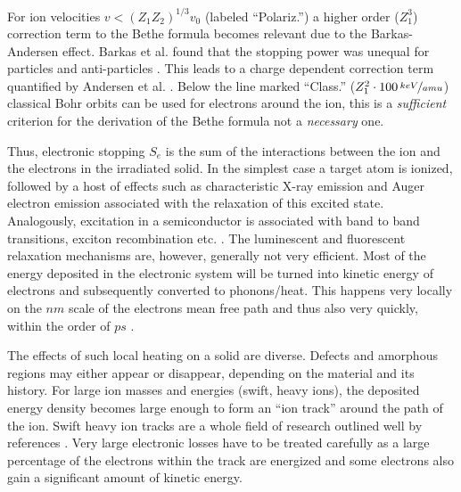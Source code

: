 For ion velocities $v < (Z_1Z_2)^{1/3}v_0$ (labeled ``Polariz.'') a higher order ($Z_1^3$) correction term to the Bethe formula becomes relevant due to the Barkas-Andersen effect. Barkas et al. found that the stopping power was unequal for particles and anti-particles \cite{smith_measurements_1953}. This leads to a charge dependent correction term quantified by Andersen et al. \cite{andersen_experimental_1969,sigmund_notes_2014}. Below the line marked ``Class.'' ($Z_1^2\cdot 100\,\nicefrac{keV}{amu}$) classical Bohr orbits can be used for electrons around the ion, this is a \emph{sufficient} criterion for the derivation of the Bethe formula not a \emph{necessary} one.

Thus, electronic stopping $S_e$ is the sum of the interactions between the ion and the electrons in the irradiated solid. In the simplest case a target atom is ionized, followed by a host of effects such as characteristic X-ray emission and Auger electron emission associated with the relaxation of this excited state. Analogously, excitation in a semiconductor is associated with band to band transitions, exciton recombination etc. \cite{wiedemann_uber_1888,boden_ionoluminescence_201}. The luminescent and fluorescent relaxation mechanisms are, however, generally not very efficient. Most of the energy deposited in the electronic system will be turned into kinetic energy of electrons and subsequently converted to phonons/heat. This happens very locally on the $nm$ scale of the electrons mean free path and thus also very quickly, within the order of $ps$ \cite{toulemonde_transient_1992, nastasi/mayer/hirvonen_ion-solid_2008}. 


The effects of such local heating on a solid are diverse. Defects and amorphous regions may either appear or disappear, depending on the material and its history. For large ion masses and energies (swift, heavy ions), the deposited energy density becomes large enough to form an ``ion track'' around the path of the ion. Swift heavy ion tracks are a whole field of research outlined well by references \cite{toulemonde_transient_1992,miotello_revisiting_1997,wesch_effect_2004}. Very large electronic losses have to be treated carefully as a large percentage of the electrons within the track are energized and some electrons also gain a significant amount of kinetic energy. 

